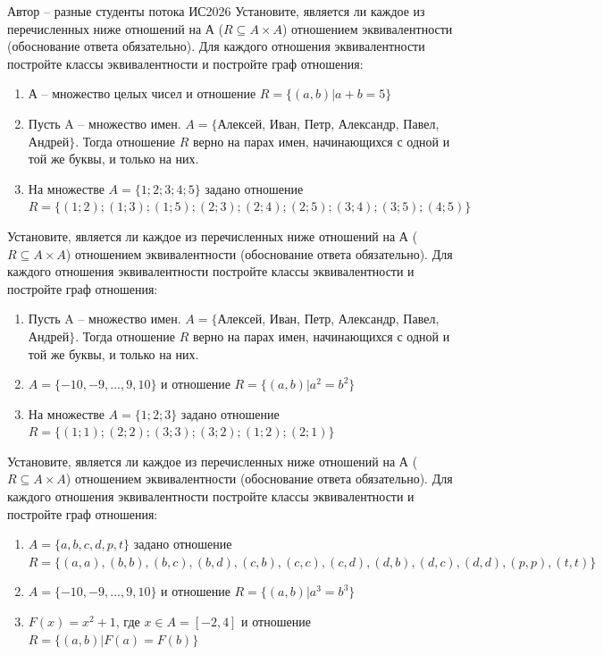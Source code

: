 \documentclass[10pt]{exam}
\begin{document}
\begin{questions}
Автор -- разные студенты потока ИС2026\question
Установите, является ли каждое из перечисленных ниже отношений на А ($R \subseteq A \times A$) отношением эквивалентности (обоснование ответа обязательно). Для каждого отношения эквивалентности постройте классы 
эквивалентности и постройте граф отношения:
\begin{enumerate}
	\renewcommand{\labelenumi}{\alph{enumi})}
	\item А -- множество целых чисел и отношение $R = \{(a,b)|a + b = 5\}$
	\item Пусть A – множество имен. $A = \{ $Алексей, Иван, Петр, Александр, Павел, Андрей$ \}$. Тогда отношение $R $ верно на парах имен, начинающихся с одной и той же буквы, и только на них.
	\item На множестве $A = \{1; 2; 3; 4; 5\}$ задано отношение $R = \{(1; 2); (1; 3); (1; 5); (2; 3); (2; 4); (2; 5); (3; 4); (3; 5); (4; 5)\}$
\end{enumerate}\question
Установите, является ли каждое из перечисленных ниже отношений на А ($R \subseteq A \times A$) отношением эквивалентности (обоснование ответа обязательно). Для каждого отношения эквивалентности постройте классы 
эквивалентности и постройте граф отношения:
\begin{enumerate}
	\renewcommand{\labelenumi}{\alph{enumi})}
	\item Пусть A -- множество имен. $A = \{ $Алексей, Иван, Петр, Александр, Павел, Андрей$ \}$. Тогда отношение $R$ верно на парах имен, начинающихся с одной и той же буквы, и только на них.
	\item $A = \{-10, -9, ..., 9, 10\}$ и отношение $ R = \{(a,b)|a^{2} = b^{2}\}$
	\item На множестве $A = \{1; 2; 3\}$ задано отношение $R = \{(1; 1); (2; 2); (3; 3); (3; 2); (1; 2); (2; 1)\}$
\end{enumerate}\question
Установите, является ли каждое из перечисленных ниже отношений на А ($R \subseteq A \times A$) отношением эквивалентности (обоснование ответа обязательно). Для каждого отношения эквивалентности постройте классы 
эквивалентности и постройте граф отношения:
\begin{enumerate}
	\renewcommand{\labelenumi}{\alph{enumi})}
	\item $A = \{a, b, c, d, p, t\}$ задано отношение $R = \{(a, a), (b, b), (b, c), (b, d), (c, b), (c, c), (c, d), (d, b), (d, c), (d, d), (p,p), (t,t)\}$
	\item $A = \{-10, -9, ..., 9, 10\}$ и отношение $R = \{(a,b)|a^{3} = b^{3}\}$
	\item $F(x)=x^{2}+1$, где $x \in A = [-2, 4]$ и отношение $R = \{(a,b)|F(a) = F(b)\}$
\end{enumerate}

\end{questions}
\end{document}
